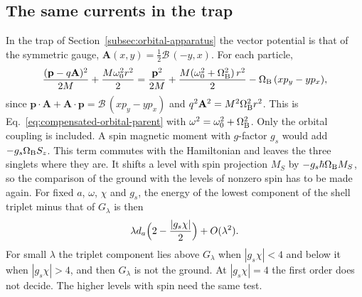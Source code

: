 \documentclass[11pt]{article}
\theoremstyle{definition}
\begin{document}
\subsection{The same currents in the trap}
\label{subsec:pair-currents-orbital}

In the trap of Section~\ref{subsec:orbital-apparatus} the vector potential is that of the symmetric gauge, $\mathbf A(x,y)=\tfrac12\mathcal B\,(-y,x)$. For each particle,
\begin{equation}
 \frac{(\mathbf p-q\mathbf A)^2}{2M}+\frac{M\omega_0^2r^2}{2}
 =\frac{\mathbf p^2}{2M}+\frac{M(\omega_0^2+\Omega_{\rm B}^2)\,r^2}{2}-\Omega_{\rm B}\,(xp_y-yp_x),
 \label{eq:pair-currents-minimal-coupling}
\end{equation}
since $\mathbf p\cdot\mathbf A+\mathbf A\cdot\mathbf p=\mathcal B\,(xp_y-yp_x)$ and $q^2\mathbf A^2=M^2\Omega_{\rm B}^2r^2$. This is Eq.~\eqref{eq:compensated-orbital-parent} with $\omega^2=\omega_0^2+\Omega_{\rm B}^2$. Only the orbital coupling is included. A spin magnetic moment with $g$-factor $g_s$ would add $-g_s\Omega_{\rm B}S_z$. This term commutes with the Hamiltonian and leaves the three singlets where they are. It shifts a level with spin projection $M_S$ by $-g_s\hbar\Omega_{\rm B}M_S$, so the comparison of the ground with the levels of nonzero spin has to be made again. For fixed $a$, $\omega$, $\chi$ and $g_s$, the energy of the lowest component of the shell triplet minus that of $G_\lambda$ is then
\begin{equation}
 \lambda d_a\Bigl(2-\frac{|g_s\chi|}{2}\Bigr)+O(\lambda^2).
 \label{eq:pair-currents-spin-gap}
\end{equation}
For small $\lambda$ the triplet component lies above $G_\lambda$ when $|g_s\chi|<4$ and below it when $|g_s\chi|>4$, and then $G_\lambda$ is not the ground. At $|g_s\chi|=4$ the first order does not decide. The higher levels with spin need the same test.
\end{document}
